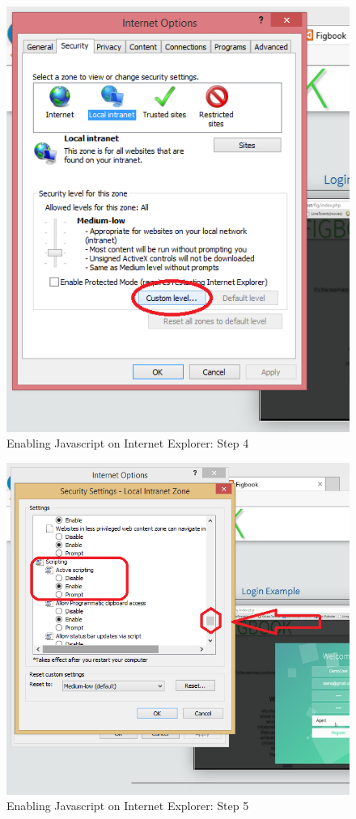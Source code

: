 	\begin{figure}[!h]
		\centering
			\includegraphics[scale=0.7]{images/javascriptIE4.png}
			\caption{Enabling Javascript on Internet Explorer: Step 4}
		\end{figure}
		
		\begin{figure}[!h]
		\centering
			\includegraphics[scale=0.7]{images/javascriptIE5.png}
			\caption{Enabling Javascript on Internet Explorer: Step 5}
		\end{figure}